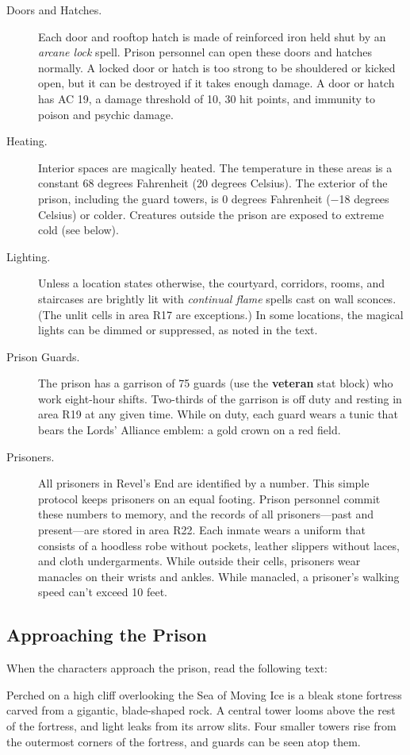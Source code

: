 \documentclass[10pt,a4paper,twoside,bg=print,twocolumn,openany,nodeprecatedcode]{dndbook}
\begin{document}
\begin{description}
\item[Doors and Hatches.]
Each door and rooftop hatch is made of reinforced iron held shut by an \textit{arcane lock} spell. Prison personnel can open these doors and hatches normally. A locked door or hatch is too strong to be shouldered or kicked open, but it can be destroyed if it takes enough damage. A door or hatch has AC 19, a damage threshold of 10, 30 hit points, and immunity to poison and psychic damage.
\item[Heating.]
Interior spaces are magically heated. The temperature in these areas is a constant 68 degrees Fahrenheit (20 degrees Celsius). The exterior of the prison, including the guard towers, is 0 degrees Fahrenheit (−18 degrees Celsius) or colder. Creatures outside the prison are exposed to extreme cold (see below).
\item[Lighting.]
Unless a location states otherwise, the courtyard, corridors, rooms, and staircases are brightly lit with \textit{continual flame} spells cast on wall sconces. (The unlit cells in area R17 are exceptions.) In some locations, the magical lights can be dimmed or suppressed, as noted in the text.
\item[Prison Guards.]
The prison has a garrison of 75 guards (use the \textbf{veteran} stat block) who work eight-hour shifts. Two-thirds of the garrison is off duty and resting in area R19 at any given time. While on duty, each guard wears a tunic that bears the Lords' Alliance emblem: a gold crown on a red field.
\item[Prisoners.]
All prisoners in Revel's End are identified by a number. This simple protocol keeps prisoners on an equal footing. Prison personnel commit these numbers to memory, and the records of all prisoners—past and present—are stored in area R22. Each inmate wears a uniform that consists of a hoodless robe without pockets, leather slippers without laces, and cloth undergarments. While outside their cells, prisoners wear manacles on their wrists and ankles. While manacled, a prisoner's walking speed can't exceed 10 feet.
\end{description}

\subsection{Approaching the Prison}
When the characters approach the prison, read the following text:

\begin{DndReadAloud}{}
Perched on a high cliff overlooking the Sea of Moving Ice is a bleak stone fortress carved from a gigantic, blade-shaped rock. A central tower looms above the rest of the fortress, and light leaks from its arrow slits. Four smaller towers rise from the outermost corners of the fortress, and guards can be seen atop them.

\end{DndReadAloud}
\end{document}
